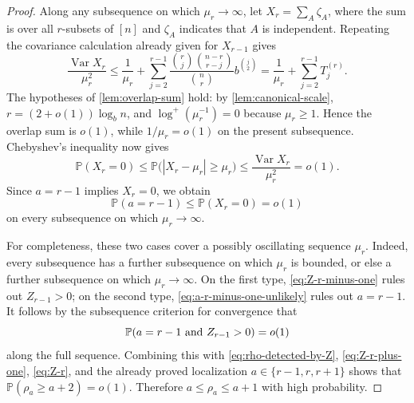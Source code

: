\documentclass[11pt,reqno]{amsart}
\theoremstyle{definition}
\theoremstyle{remark}
\newcommand{\PP}{\mathbb P}
\begin{document}
\begin{proof}
Along any subsequence on which $\mu_r\to\infty$, let
$X_r=\sum_A\zeta_A$, where the sum is over all $r$-subsets of $[n]$ and
$\zeta_A$ indicates that $A$ is independent.  Repeating the covariance
calculation already given for $X_{r-1}$ gives
\[
 \frac{\operatorname{Var}X_r}{\mu_r^2}
 \le\frac1{\mu_r}+
 \sum_{j=2}^{r-1}
 \frac{\binom rj\binom{n-r}{r-j}}{\binom nr}
 b^{\binom j2}
 =\frac1{\mu_r}+\sum_{j=2}^{r-1}T_j^{(r)}.
\]
The hypotheses of \cref{lem:overlap-sum} hold: by
\cref{lem:canonical-scale}, $r=(2+o(1))\log_b n$, and
$\log^+(\mu_r^{-1})=0$ because $\mu_r\ge1$.  Hence the overlap sum is
$o(1)$, while $1/\mu_r=o(1)$ on the present subsequence.  Chebyshev's
inequality now gives
\[
 \PP(X_r=0)
 \le\PP\bigl(|X_r-\mu_r|\ge\mu_r\bigr)
 \le\frac{\operatorname{Var}X_r}{\mu_r^2}=o(1).
\]
Since $a=r-1$ implies $X_r=0$, we obtain
\begin{equation}\label{eq:a-r-minus-one-unlikely}
 \PP(a=r-1)\le\PP(X_r=0)=o(1)
\end{equation}
on every subsequence on which $\mu_r\to\infty$.

For completeness, these two cases cover a possibly oscillating sequence
$\mu_r$.  Indeed, every subsequence has a further subsequence on which
$\mu_r$ is bounded, or else a further subsequence on which
$\mu_r\to\infty$.  On the first type, \eqref{eq:Z-r-minus-one} rules out
$Z_{r-1}>0$; on the second type, \eqref{eq:a-r-minus-one-unlikely} rules
out $a=r-1$.  It follows by the subsequence criterion for convergence that
\[
 \PP(a=r-1\ \hbox{and}\ Z_{r-1}>0)=o(1)
\]
along the full sequence.  Combining this with
\eqref{eq:rho-detected-by-Z}, \eqref{eq:Z-r-plus-one},
\eqref{eq:Z-r}, and the already proved localization
$a\in\{r-1,r,r+1\}$ shows that
$\PP(\rho_a\ge a+2)=o(1)$.  Therefore
$a\le\rho_a\le a+1$ with high probability.
\end{proof}
\end{document}
